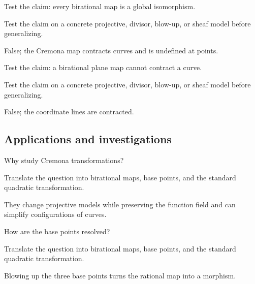 \begin{exercise}[Isomorphism]\label{exr:vi44-expand-11}
Test the claim: every birational map is a global isomorphism.
\end{exercise}
\begin{hint}
Test the claim on a concrete projective, divisor, blow-up, or sheaf model before generalizing.
\end{hint}
\begin{solution}
False; the Cremona map contracts curves and is undefined at points.
\end{solution}

\begin{exercise}\label{exr:vi44-expand-12}
Test the claim: a birational plane map cannot contract a curve.
\end{exercise}
\begin{hint}
Test the claim on a concrete projective, divisor, blow-up, or sheaf model before generalizing.
\end{hint}
\begin{solution}
False; the coordinate lines are contracted.
\end{solution}

\subsection*{Applications and investigations}

\begin{exercise}\label{exr:vi44-expand-13}
Why study Cremona transformations?
\end{exercise}
\begin{hint}
Translate the question into birational maps, base points, and the standard quadratic transformation.
\end{hint}
\begin{solution}
They change projective models while preserving the function field and can simplify configurations of curves.
\end{solution}

\begin{exercise}\label{exr:vi44-expand-14}
How are the base points resolved?
\end{exercise}
\begin{hint}
Translate the question into birational maps, base points, and the standard quadratic transformation.
\end{hint}
\begin{solution}
Blowing up the three base points turns the rational map into a morphism.
\end{solution}

